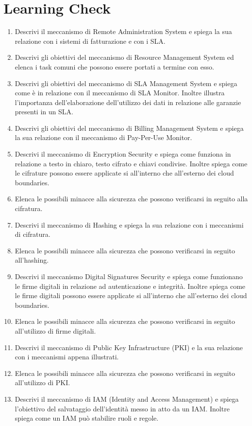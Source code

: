 \section{Learning Check}
\begin{enumerate}
    \item Descrivi il meccanismo di Remote Administration System e spiega la sua relazione con i sistemi di fatturazione e con i SLA.
    \item Descrivi gli obiettivi del meccanismo di Resource Management System ed elenca i task comuni che possono essere portati a termine con esso.
    \item Descrivi gli obiettivi del meccanismo di SLA Management System e spiega come è in relazione con il meccanismo di SLA Monitor. Inoltre illustra l'importanza dell'elaborazione dell'utilizzo dei dati in relazione alle garanzie presenti in un SLA.
    \item Descrivi gli obiettivi del meccanismo di Billing Management System e spiega la sua relazione con il meccanismo di Pay-Per-Use Monitor.
    \item Descrivi il meccanismo di Encryption Security e spiega come funziona in relazione a testo in chiaro, testo cifrato e chiavi condivise. Inoltre spiega come le cifrature possono essere applicate si all'interno che all'esterno dei cloud boundaries.
    \item Elenca le possibili minacce alla sicurezza che possono verificarsi in seguito alla cifratura.
    \item Descrivi il meccanismo di Hashing e spiega la sua relazione con i meccanismi di cifratura.
    \item Elenca le possibili minacce alla sicurezza che possono verificarsi in seguito all'hashing.
    \item Descrivi il meccanismo Digital Signatures Security e spiega come funzionano le firme digitali in relazione ad autenticazione e integrità. Inoltre spiega come le firme digitali possono essere applicate si all'interno che all'esterno dei cloud boundaries.
    \item Elenca le possibili minacce alla sicurezza che possono verificarsi in seguito all'utilizzo di firme digitali.
    \item Descrivi il meccanismo di Public Key Infrastructure (PKI) e la sua relazione con i meccanismi appena illustrati.
    \item Elenca le possibili minacce alla sicurezza che possono verificarsi in seguito all'utilizzo di PKI.
    \item Descrivi il meccanismo di IAM (Identity and Access Management) e spiega l'obiettivo del salvataggio dell'identità messo in atto da un IAM. Inoltre spiega come un IAM può stabilire ruoli e regole.

\end{enumerate}
